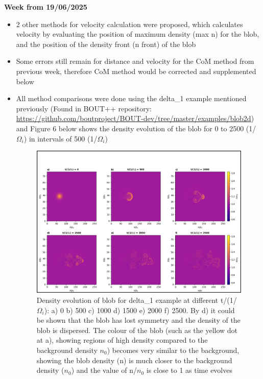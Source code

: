 \documentclass{article}
\begin{document}
\begin{arrowlist}
    \item \textbf{Week from 19/06/2025}
        \begin{itemize}
            \item 2 other methods for velocity calculation were proposed, which calculates velocity by evaluating the position of maximum density (max n) for the blob, and the position of the density front (n front) of the blob
            \item Some errors still remain for distance and velocity for the CoM method from previous week, therefore CoM method would be corrected and supplemented below
            \item All method comparisons were done using the delta\_1 example mentioned previously (Found in BOUT++ repository: \url{https://github.com/boutproject/BOUT-dev/tree/master/examples/blob2d}) and Figure 6 below shows the density evolution of the blob for 0 to 2500 (1/$\Omega_i$) in intervals of 500 (1/$\Omega_i$)

    \begin{figure}[H]
    \centering
        \includegraphics[width=\textwidth]{./Fig/Fig6 n hmap t0_t50}
        \normalsize{\caption{Density evolution of blob for delta\_1 example at different t/(1/$\Omega_i$): a) 0 b) 500 c) 1000 d) 1500 e) 2000 f) 2500. By d) it could be shown that the blob has lost symmetry and the density of the blob is dispersed. The colour of the blob (such as the yellow dot at a), showing regions of high density compared to the background density $n_0$) becomes very similar to the background, showing the blob density (n) is much closer to the background density ($n_0$) and the value of n/$n_0$ is close to 1 as time evolves}
        \label{fig:fig6}}
    \end{figure}   
            

\end{itemize}
\end{arrowlist}
\end{document}
